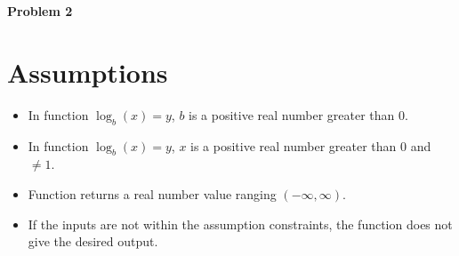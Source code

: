 \documentclass[a4paper, 11pt]{article}
\begin{document}
\newpage
\large\textbf{Problem 2}
\section*{Assumptions}
\begin{itemize}
    \item In function $\log _b \left( x \right)=y$, $b$ is a positive real number greater than $0$.
    \item In function $\log _b \left( x \right)=y$, $x$ is a positive real number greater than $0$ and $\not=1$.
    \item Function returns a real number value ranging $(-\infty,\infty)$.
    \item If the inputs are not within the assumption constraints, the function does not give the desired output.
\end{itemize}
\end{document}
